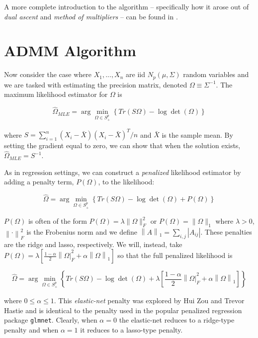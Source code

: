 \documentclass[12pt,]{book}
\theoremstyle{definition}
\theoremstyle{definition}
\theoremstyle{definition}
\theoremstyle{remark}
\begin{document}
A more complete introduction to the algorithm -- specifically how it
arose out of \emph{dual ascent} and \emph{method of multipliers} -- can
be found in \citet{boyd2011distributed}.

\vspace{1cm}

\hypertarget{admm-algorithm}{%
\section{ADMM Algorithm}\label{admm-algorithm}}

Now consider the case where \(X_{1}, ..., X_{n}\) are iid
\(N_{p}(\mu, \Sigma)\) random variables and we are tasked with
estimating the precision matrix, denoted \(\Omega \equiv \Sigma^{-1}\).
The maximum likelihood estimator for \(\Omega\) is

\[ \hat{\Omega}_{MLE} = \arg\min_{\Omega \in S_{+}^{p}}\left\{ Tr\left(S\Omega\right) - \log \det\left(\Omega \right) \right\} \]

where \(S = \sum_{i = 1}^{n}(X_{i} - \bar{X})(X_{i} - \bar{X})^{T}/n\)
and \(\bar{X}\) is the sample mean. By setting the gradient equal to
zero, we can show that when the solution exists,
\(\hat{\Omega}_{MLE} = S^{-1}\).

As in regression settings, we can construct a \emph{penalized}
likelihood estimator by adding a penalty term,
\(P\left( \Omega \right)\), to the likelihood:

\[ \hat{\Omega} = \arg\min_{\Omega \in S_{+}^{p}}\left\{ Tr\left(S\Omega\right) - \log \det\left(\Omega \right) + P\left( \Omega \right) \right\} \]

\(P\left( \Omega \right)\) is often of the form
\(P\left(\Omega \right) = \lambda\|\Omega \|_{F}^{2}\) or
\(P\left(\Omega \right) = \|\Omega\|_{1}\) where \(\lambda > 0\),
\(\left\|\cdot \right\|_{F}^{2}\) is the Frobenius norm and we define
\(\left\|A \right\|_{1} = \sum_{i, j} \left| A_{ij} \right|\). These
penalties are the ridge and lasso, respectively. We will, instead, take
\(P\left( \Omega \right) = \lambda\left[\frac{1 - \alpha}{2}\left\| \Omega \right|_{F}^{2} + \alpha\left\| \Omega \right\|_{1} \right]\)
so that the full penalized likelihood is

\[ \hat{\Omega} = \arg\min_{\Omega \in S_{+}^{p}}\left\{ Tr\left(S\Omega\right) - \log \det\left(\Omega \right) + \lambda\left[\frac{1 - \alpha}{2}\left\| \Omega \right|_{F}^{2} + \alpha\left\| \Omega \right\|_{1} \right] \right\} \]

where \(0 \leq \alpha \leq 1\). This \emph{elastic-net} penalty was
explored by Hui Zou and Trevor Hastie \citep{zou2005regularization} and
is identical to the penalty used in the popular penalized regression
package \texttt{glmnet}. Clearly, when \(\alpha = 0\) the elastic-net
reduces to a ridge-type penalty and when \(\alpha = 1\) it reduces to a
lasso-type penalty.
\end{document}

